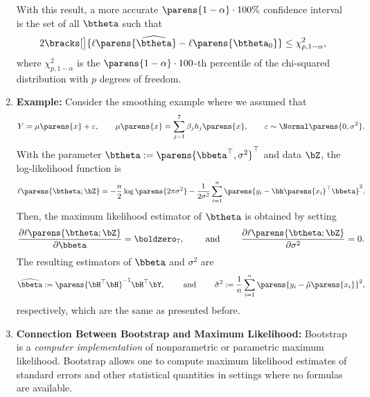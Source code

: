 \documentclass[12pt]{article}
\begin{document}
\begin{enumerate}[label=\textbf{\arabic*.}]
	With this result, a more accurate $\parens{1 - \alpha} \cdot 100\%$ confidence interval is the set of all $\btheta$ such that
	\begin{align}
		2 \bracks[\big]{\ell \parens{\widehat{\btheta}} - \ell \parens{\btheta_0} } \le \chi^2_{p, 1-\alpha}, 
	\end{align}
	where $\chi^2_{p, 1-\alpha}$ is the $\parens{1 - \alpha} \cdot 100$-th percentile of the chi-squared distribution with $p$ degrees of freedom. 
	
	\item \textbf{Example:} Consider the smoothing example where we assumed that 
	\begin{equation}
		Y = \mu \parens{x} + \varepsilon, \hspace{20pt} \mu \parens{x} = \sum_{j=1}^7 \beta_j h_j \parens{x}, \hspace{20pt} \varepsilon \sim \Normal \parens{0, \sigma^2}. 
	\end{equation}
	With the parameter $\btheta := \parens{\bbeta^\top, \sigma^2}^\top$ and data $\bZ$, the log-likelihood function is 
	\begin{equation}
		\ell \parens{\btheta; \bZ} = -\frac{n}{2} \log \parens{2 \pi \sigma^2} - \frac{1}{2 \sigma^2} \sum_{i=1}^n \parens{y_i - \bh \parens{x_i}^\top \bbeta}^2. 
	\end{equation}
	Then, the maximum likelihood estimator of $\btheta$ is obtained by setting 
	\begin{equation} 
		\frac{\partial \ell \parens{\btheta; \bZ}}{\partial \bbeta} = \boldzero_7, \hspace{20pt} \text{ and } \hspace{20pt} \frac{\partial \ell \parens{\btheta; \bZ} }{\partial \sigma^2} = 0. 
	\end{equation}
	The resulting estimators of $\bbeta$ and $\sigma^2$ are 
	\begin{equation}
		\widehat{\bbeta} := \parens{\bH^\top \bH}^{-1}\bH^\top \bY, \hspace{20pt} \text{ and } \hspace{20pt} \hat{\sigma}^2 := \frac{1}{n} \sum_{i=1}^n \parens{y_i - \hat{\mu} \parens{x_i}}^2, 
	\end{equation}
	respectively, which are the same as presented before. 
	
	\item \textbf{Connection Between Bootstrap and Maximum Likelihood:} Bootstrap is a \textit{computer implementation} of nonparametric or parametric maximum likelihood. Bootstrap allows one to compute maximum likelihood estimates of standard errors and other statistical quantities in settings where no formulas are available. 

\end{enumerate}
\end{document}

